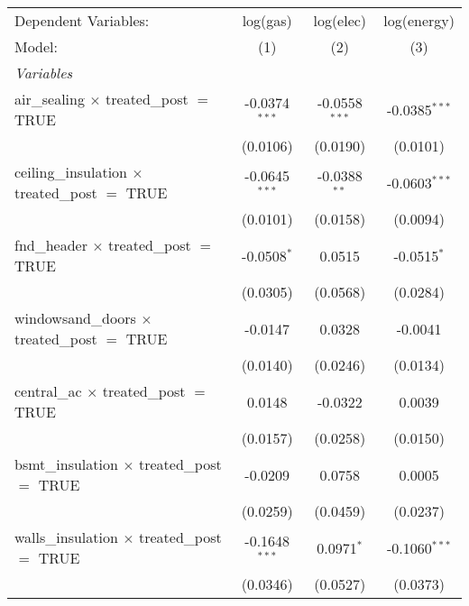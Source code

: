 
\begingroup
\centering
\begin{tabular}{lccc}
   \tabularnewline \midrule \midrule
   Dependent Variables:                                      & log(gas)        & log(elec)       & log(energy)\\  
   Model:                                                    & (1)             & (2)             & (3)\\  
   \midrule
   \emph{Variables}\\
   air\_sealing $\times$ treated\_post $=$ TRUE              & -0.0374$^{***}$ & -0.0558$^{***}$ & -0.0385$^{***}$\\   
                                                             & (0.0106)        & (0.0190)        & (0.0101)\\   
   ceiling\_insulation $\times$ treated\_post $=$ TRUE       & -0.0645$^{***}$ & -0.0388$^{**}$  & -0.0603$^{***}$\\   
                                                             & (0.0101)        & (0.0158)        & (0.0094)\\   
   fnd\_header $\times$ treated\_post $=$ TRUE               & -0.0508$^{*}$   & 0.0515          & -0.0515$^{*}$\\   
                                                             & (0.0305)        & (0.0568)        & (0.0284)\\   
   windowsand\_doors $\times$ treated\_post $=$ TRUE         & -0.0147         & 0.0328          & -0.0041\\   
                                                             & (0.0140)        & (0.0246)        & (0.0134)\\   
   central\_ac $\times$ treated\_post $=$ TRUE               & 0.0148          & -0.0322         & 0.0039\\   
                                                             & (0.0157)        & (0.0258)        & (0.0150)\\   
   bsmt\_insulation $\times$ treated\_post $=$ TRUE          & -0.0209         & 0.0758          & 0.0005\\   
                                                             & (0.0259)        & (0.0459)        & (0.0237)\\   
   walls\_insulation $\times$ treated\_post $=$ TRUE         & -0.1648$^{***}$ & 0.0971$^{*}$    & -0.1060$^{***}$\\   
                                                             & (0.0346)        & (0.0527)        & (0.0373)\\   

\end{tabular}
